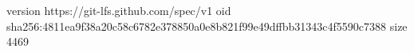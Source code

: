 version https://git-lfs.github.com/spec/v1
oid sha256:4811ea9f38a20c58c6782e378850a0e8b821f99e49dffbb31343c4f5590c7388
size 4469
